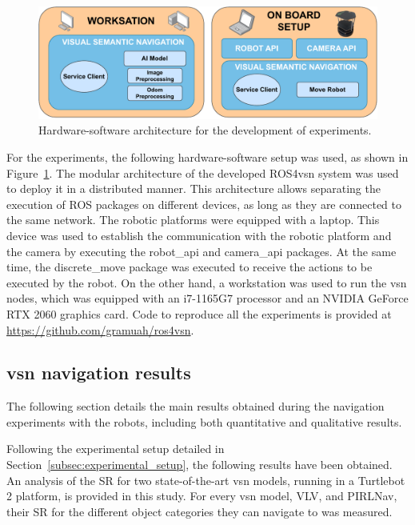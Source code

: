 \begin{figure}
    \centering
        \includegraphics[width=\linewidth]{figures/ros4vsn/hw-sw-scheme}
        \caption{Hardware-software architecture for the development of experiments.}
        \label{fig:setup_experiment}
\end{figure}

For the experiments, the following hardware-software setup was used, as shown in Figure~\ref{fig:setup_experiment}.
The modular architecture of the developed ROS4\acrshort{vsn} system was used to deploy it in a distributed manner.
This architecture allows separating the execution of ROS packages on different devices, as long as they are connected to the same network.
The robotic platforms were equipped with a laptop.
This device was used to establish the communication with the robotic platform and the camera by executing the robot\_api and camera\_api packages.
At the same time, the discrete\_move package was executed to receive the actions to be executed by the robot.
On the other hand, a workstation was used to run the \acrshort{vsn} nodes, which was equipped with an i7-1165G7 processor and an NVIDIA GeForce RTX 2060 graphics card.
Code to reproduce all the experiments is provided at \url{https://github.com/gramuah/ros4vsn}.


\subsection{\acrshort{vsn} navigation results}
\label{subsec:vsn}
The following section details the main results obtained during the navigation experiments with the robots, including both quantitative and qualitative results.

Following the experimental setup detailed in Section~\ref{subsec:experimental_setup}, the following results have been obtained.
An analysis of the SR for two state-of-the-art \acrshort{vsn} models, running in a Turtlebot 2 platform, is provided in this study.
For every \acrshort{vsn} model, \ie VLV, and PIRLNav, their SR for the different object categories they can navigate to was measured.

